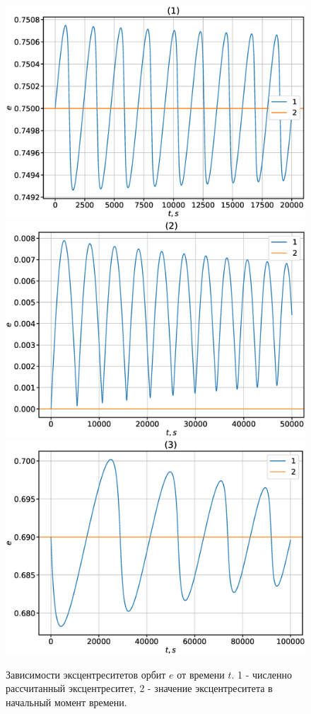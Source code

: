 \documentclass[12pt]{article}
\begin{document}
\begin{figure}[H]
      \includegraphics[width=1.0\linewidth]{e_t_1.eps}
    \endminipage\hfill
      \includegraphics[width=1.0\linewidth]{e_t_2.eps}
    \endminipage\hfill
      \includegraphics[width=1.0\linewidth]{e_t_3.eps}
    \endminipage
    \caption{Зависимости эксцентреситетов орбит $e$ от времени $t$. 1 - численно рассчитанный эксцентреситет, 
    2 - значение эксцентреситета в начальный момент времени.}
    \label{fig:6}
    \end{figure}
\end{document}
